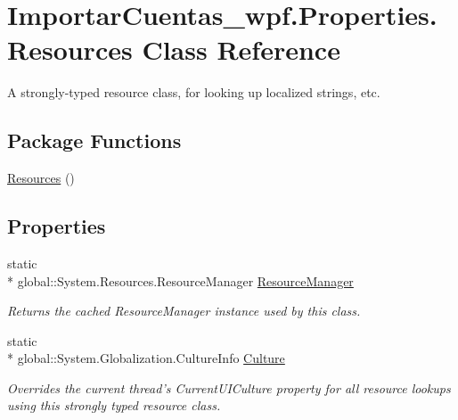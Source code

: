 \hypertarget{class_importar_cuentas__wpf_1_1_properties_1_1_resources}{\section{Importar\-Cuentas\-\_\-wpf.\-Properties.\-Resources Class Reference}
\label{class_importar_cuentas__wpf_1_1_properties_1_1_resources}
}


A strongly-\/typed resource class, for looking up localized strings, etc.  


\subsection*{Package Functions}
\begin{DoxyCompactItemize}
\item 
\hyperlink{class_importar_cuentas__wpf_1_1_properties_1_1_resources_a69c7f631e2ad183458132c5682ac8540}{Resources} ()
\end{DoxyCompactItemize}
\subsection*{Properties}
\begin{DoxyCompactItemize}
\item 
static \\*
global\-::\-System.\-Resources.\-Resource\-Manager \hyperlink{class_importar_cuentas__wpf_1_1_properties_1_1_resources_af2bc57c7d40375209d08b86c66f7e929}{Resource\-Manager}
\begin{DoxyCompactList}\small\item\em Returns the cached Resource\-Manager instance used by this class. \end{DoxyCompactList}\item 
static \\*
global\-::\-System.\-Globalization.\-Culture\-Info \hyperlink{class_importar_cuentas__wpf_1_1_properties_1_1_resources_a1f348c62caade2382f98b7a5977fc1f8}{Culture}
\begin{DoxyCompactList}\small\item\em Overrides the current thread's Current\-U\-I\-Culture property for all resource lookups using this strongly typed resource class. \end{DoxyCompactList}\end{DoxyCompactItemize}
